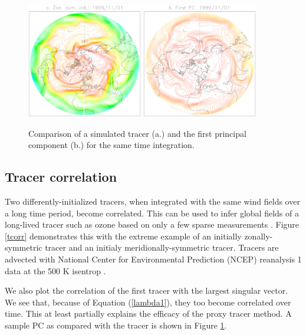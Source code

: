 \documentclass{article}
\begin{document}
\begin{figure}
\includegraphics[width=0.45\textwidth]{../pc_proxy/tsample.eps}
\includegraphics[width=0.45\textwidth]{../pc_proxy/pc1.eps}
\caption{Comparison of a simulated tracer (a.) and the first principal
component (b.) for the same time integration.}\label{pc1}
\end{figure}

\subsection{Tracer correlation}

Two differently-initialized tracers, when integrated with the same
wind fields over a long time period, become correlated.
This can be used to infer global fields of a long-lived tracer such as
ozone based on only a few sparse measurements 
\citep{Allen_Nakamura2003,Randall_etal2002}.
Figure \ref{tcorr} demonstrates this with the extreme example of an initially
zonally-symmetric tracer and an initialy meridionally-symmetric tracer.
Tracers are advected with National Center for Environmental Prediction
(NCEP) reanalysis 1 data at the 500 K isentrop \citep{Kalnay_etal1996}.

We also plot the correlation of the first tracer with the largest singular
vector.  We see that, because of Equation (\ref{lambda1}), they too become
correlated over time.
This at least partially explains the efficacy of the proxy tracer method.
A sample PC as compared with the tracer is shown in Figure \ref{pc1}.  
\end{document}
